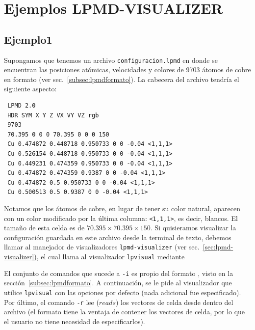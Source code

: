 \section{Ejemplos LPMD-VISUALIZER}

\subsection{Ejemplo1}

Supongamos que tenemos un archivo \verb+configuracion.lpmd+ en donde se encuentran las posiciones at\'omicas, velocidades y colores de 9703 \'atomos de cobre en formato {\lpmd} (ver sec.~\ref{subsec:lpmdformato}). La cabecera del archivo tendr\'ia el siguiente aspecto:\\

 \begin{verbatim}
 LPMD 2.0
 HDR SYM X Y Z VX VY VZ rgb 
 9703
 70.395 0 0 0 70.395 0 0 0 150
 Cu 0.474872 0.448718 0.950733 0 0 -0.04 <1,1,1>
 Cu 0.526154 0.448718 0.950733 0 0 -0.04 <1,1,1>
 Cu 0.449231 0.474359 0.950733 0 0 -0.04 <1,1,1>
 Cu 0.474872 0.474359 0.9387 0 0 -0.04 <1,1,1>
 Cu 0.474872 0.5 0.950733 0 0 -0.04 <1,1,1>
 Cu 0.500513 0.5 0.9387 0 0 -0.04 <1,1,1>
 \end{verbatim}

Notamos que los \'atomos de cobre, en lugar de tener su color natural, aparecen con un color modificado por la \'ultima columna: \verb+<1,1,1>+, es decir, blancos. El tama\~no de esta celda es de $70.395\times70.395\times150$. Si quisieramos visualizar la configuraci\'on guardada en este archivo desde la terminal de texto, debemos llamar al manejador de visualizadores \verb+lpmd-visualizer+ (ver sec.~\ref{sec:lpmd-visualizer}), el cual llama al visualizador \verb+lpvisual+ mediante


El conjunto de comandos que sucede a \verb+-i+ es propio del formato {\lpmd}, visto en la secci\'on~\ref{subsec:lpmdformato}. A continuaci\'on, se le pide al visualizador que utilice \verb+lpvisual+ con las opciones por defecto (nada adicional fue especificado). Por \'ultimo, el comando \verb+-r+ lee ($reads$) los vectores de celda desde dentro del archivo (el formato {\lpmd} tiene la ventaja de contener los vectores de celda, por lo que el usuario no tiene necesidad de especificarlos).

